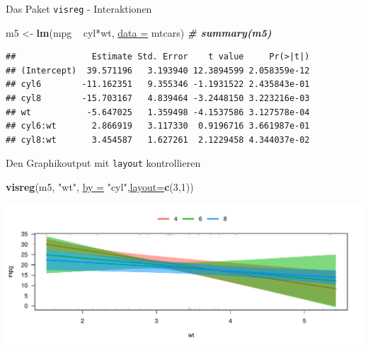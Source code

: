 \documentclass[
  ignorenonframetext,
]{beamer}
\newenvironment{Shaded}{\begin{snugshade}}{\end{snugshade}}
\newcommand{\CommentTok}[1]{\textcolor[rgb]{0.00,0.40,1.00}{\textbf{\textit{#1}}}}
\newcommand{\DataTypeTok}[1]{\textcolor[rgb]{0.74,0.68,0.62}{\underline{#1}}}
\newcommand{\DecValTok}[1]{\textcolor[rgb]{0.27,0.67,0.26}{#1}}
\newcommand{\KeywordTok}[1]{\textcolor[rgb]{0.26,0.66,0.93}{\textbf{#1}}}
\newcommand{\NormalTok}[1]{\textcolor[rgb]{0.74,0.68,0.62}{#1}}
\newcommand{\OperatorTok}[1]{\textcolor[rgb]{0.74,0.68,0.62}{#1}}
\newcommand{\StringTok}[1]{\textcolor[rgb]{0.02,0.61,0.04}{#1}}
\begin{document}
\begin{frame}[fragile]{Das Paket \texttt{visreg} - Interaktionen}
\protect\hypertarget{das-paket-visreg---interaktionen}{}

\begin{Shaded}
\begin{Highlighting}[]
\NormalTok{m5 <-}\StringTok{ }\KeywordTok{lm}\NormalTok{(mpg }\OperatorTok{~}\StringTok{ }\NormalTok{cyl}\OperatorTok{*}\NormalTok{wt, }\DataTypeTok{data =}\NormalTok{ mtcars)}
\CommentTok{# summary(m5)}
\end{Highlighting}
\end{Shaded}

\begin{verbatim}
##               Estimate Std. Error    t value     Pr(>|t|)
## (Intercept)  39.571196   3.193940 12.3894599 2.058359e-12
## cyl6        -11.162351   9.355346 -1.1931522 2.435843e-01
## cyl8        -15.703167   4.839464 -3.2448150 3.223216e-03
## wt           -5.647025   1.359498 -4.1537586 3.127578e-04
## cyl6:wt       2.866919   3.117330  0.9196716 3.661987e-01
## cyl8:wt       3.454587   1.627261  2.1229458 4.344037e-02
\end{verbatim}

\end{frame}

\begin{frame}[fragile]{Den Graphikoutput mit \texttt{layout}
kontrollieren}
\protect\hypertarget{den-graphikoutput-mit-layout-kontrollieren}{}

\begin{Shaded}
\begin{Highlighting}[]
\KeywordTok{visreg}\NormalTok{(m5, }\StringTok{"wt"}\NormalTok{, }\DataTypeTok{by =} \StringTok{"cyl"}\NormalTok{,}\DataTypeTok{layout=}\KeywordTok{c}\NormalTok{(}\DecValTok{3}\NormalTok{,}\DecValTok{1}\NormalTok{))}
\end{Highlighting}
\end{Shaded}

\includegraphics{LineareRegression_files/figure-beamer/unnamed-chunk-45-1.pdf}

\end{frame}
\end{document}
